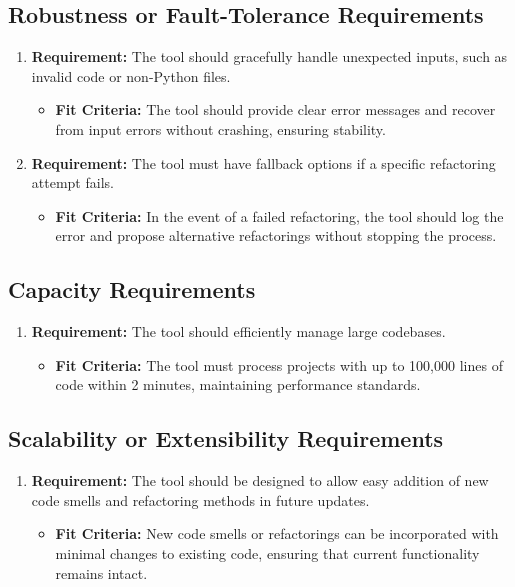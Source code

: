 \documentclass[12pt]{article}
\begin{document}
\subsection{Robustness or Fault-Tolerance Requirements}
\begin{enumerate}
  \item \textbf{Requirement:} The tool should gracefully handle unexpected inputs, such as invalid code or non-Python files.
  \begin{itemize}[label={}]
      \item \textbf{Fit Criteria:} The tool should provide clear error messages and recover from input errors without crashing, ensuring stability.
  \end{itemize}
  \item \textbf{Requirement:} The tool must have fallback options if a specific refactoring attempt fails.
  \begin{itemize}[label={}]
      \item \textbf{Fit Criteria:} In the event of a failed refactoring, the tool should log the error and propose alternative refactorings without stopping the process.
  \end{itemize}
\end{enumerate}
\subsection{Capacity Requirements}
\begin{enumerate}
  \item \textbf{Requirement:} The tool should efficiently manage large codebases.
  \begin{itemize}[label={}]
      \item \textbf{Fit Criteria:} The tool must process projects with up to 100,000 lines of code within 2 minutes, maintaining performance standards.
  \end{itemize}
\end{enumerate}
\subsection{Scalability or Extensibility Requirements}
\begin{enumerate}
  \item \textbf{Requirement:} The tool should be designed to allow easy addition of new code smells and refactoring methods in future updates.
  \begin{itemize}[label={}]
      \item \textbf{Fit Criteria:}  New code smells or refactorings can be incorporated with minimal changes to existing code, ensuring that current functionality remains intact.
  \end{itemize}
\end{enumerate}
\end{document}
